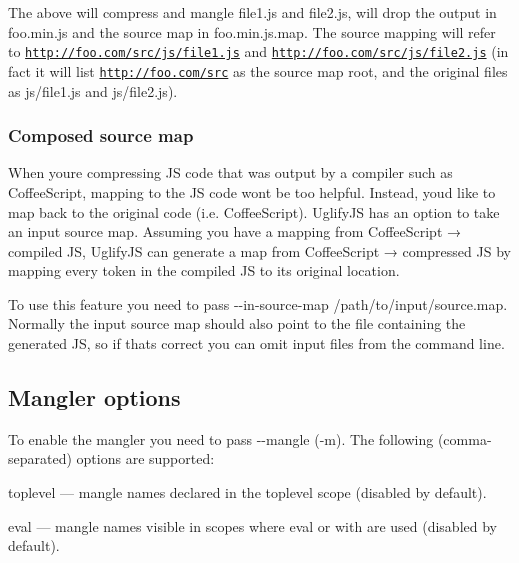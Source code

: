 The above will compress and mangle {\ttfamily file1.\+js} and {\ttfamily file2.\+js}, will drop the output in {\ttfamily foo.\+min.\+js} and the source map in {\ttfamily foo.\+min.\+js.\+map}. The source mapping will refer to {\ttfamily \href{http://foo.com/src/js/file1.js}{\tt http\+://foo.\+com/src/js/file1.\+js}} and {\ttfamily \href{http://foo.com/src/js/file2.js}{\tt http\+://foo.\+com/src/js/file2.\+js}} (in fact it will list {\ttfamily \href{http://foo.com/src}{\tt http\+://foo.\+com/src}} as the source map root, and the original files as {\ttfamily js/file1.\+js} and {\ttfamily js/file2.\+js}).

\subsubsection*{Composed source map}

When you\textquotesingle{}re compressing JS code that was output by a compiler such as Coffee\+Script, mapping to the JS code won\textquotesingle{}t be too helpful. Instead, you\textquotesingle{}d like to map back to the original code (i.\+e. Coffee\+Script). Uglify\+JS has an option to take an input source map. Assuming you have a mapping from Coffee\+Script → compiled JS, Uglify\+JS can generate a map from Coffee\+Script → compressed JS by mapping every token in the compiled JS to its original location.

To use this feature you need to pass {\ttfamily -\/-\/in-\/source-\/map /path/to/input/source.map}. Normally the input source map should also point to the file containing the generated JS, so if that\textquotesingle{}s correct you can omit input files from the command line.

\subsection*{Mangler options}

To enable the mangler you need to pass {\ttfamily -\/-\/mangle} ({\ttfamily -\/m}). The following (comma-\/separated) options are supported\+:


\begin{DoxyItemize}
\item {\ttfamily toplevel} — mangle names declared in the toplevel scope (disabled by default).
\item {\ttfamily eval} — mangle names visible in scopes where {\ttfamily eval} or {\ttfamily with} are used (disabled by default).
\end{DoxyItemize}

